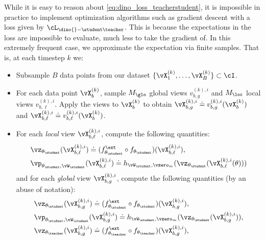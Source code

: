 \documentclass[../../book-main.tex]{subfiles}
\begin{document}
While it is easy to reason about \eqref{eq:dino_loss_teacherstudent},
it is impossible in practice to implement optimization algorithms
such as gradient descent with a loss given by
\(\cL_{\dino{}-\student\teacher}\). This is because the expectations
in the loss are impossible to evaluate, much less to take the
gradient of. In this extremely frequent case, we approximate the
expectation via finite samples. That is, at each timestep \(k\) we:
\begin{itemize}
    \item Subsample \(B\) data points from our dataset
        \(\{\vX_{1}^{(k)}, \dots, \vX_{B}^{(k)}\} \subset \cI\).
    \item For each data point \(\vX_{b}^{(k)}\), sample \(M_{\glo}\)
        global views \(v_{b, g}^{(k), i}\) and \(M_{\loc}\) local
        views \(v_{b, \ell}^{(k), i}\). Apply the views to
        \(\vX_{b}^{(k)}\) to obtain \(\vX_{b, g}^{(k), i} \doteq
        v_{b, g}^{(k), i}(\vX_{b}^{(k)})\) and \(\vX_{b, \ell}^{(k),
        i} \doteq v_{b, \ell}^{(k), i}(\vX_{b}^{(k)})\).
    \item For each \textit{local} view \(\vX_{b, \ell}^{(k), i}\),
        compute the following quantities:
        \begin{align}
            &\vz_{\theta_{\student}}(\vX_{b, \ell}^{(k), i}) \doteq
            (f_{\theta_{\student}}^{\ext} \circ
            f_{\theta_{\student}})(\vX_{b, \ell}^{(k), i}), \\
            &\vp_{\theta_{\student}, \vW_{\student}}(\vX_{b,
            \ell}^{(k), i}) \doteq h_{\vW_{\student},
            \vzero_{m}}(\vz_{\theta_{\student}}(\vX_{b, \ell}^{(k), i}(\theta)))
        \end{align}
        and for each \textit{global} view \(\vX_{b, g}^{(k), i}\),
        compute the following quantities (by an abuse of notation):
        \begin{align}
            &\vz_{\theta_{\student}}(\vX_{b, g}^{(k), i}) \doteq
            (f_{\theta_{\student}}^{\ext} \circ
            f_{\theta_{\student}})(\vX_{b, g}^{(k), i}), \\
            &\vp_{\theta_{\student}, \vW_{\student}}(\vX_{b, g}^{(k),
            i}) \doteq h_{\vW_{\student},
            \vzero_{m}}(\vz_{\theta_{\student}}(\vX_{b, g}^{(k), i})), \\
            &\vz_{\theta_{\teacher}}(\vX_{b, g}^{(k), i}) \doteq
            (f_{\theta_{\teacher}}^{\ext} \circ
            f_{\theta_{\teacher}})(\vX_{b, g}^{(k), i}), \\

\end{align}
\end{itemize}
\end{document}
